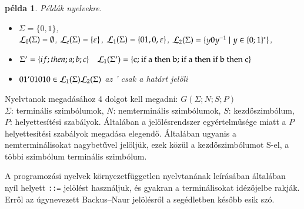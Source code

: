\documentclass[a4paper]{article}
\newtheorem{pelda}{példa}[section]
\begin{document}
\begin{pelda}
  Példák nyelvekre.
\begin{itemize}
\item $\Sigma=\{0, 1\}$,\\ ${\cal L}_0(\Sigma) = \emptyset$,
	${\cal L}_e(\Sigma) = \{\varepsilon \}$,
	${\cal L}_1(\Sigma) = \{01, 0, \varepsilon \}$,
	${\cal L}_2(\Sigma) = \{y0y^{-1} \mid y\in \{0; 1\}^*\}$,
\item $\Sigma' = \{ if; then; a; b; c\} \quad {\cal L}_1(\Sigma')=\{\mbox{c; if a then b; if a then
if b then c}\}$
\item $01'01010 \in {\cal L}_1(\Sigma){\cal L}_2(\Sigma)$ \quad az ' csak a határt jelöli
\end{itemize}
\end{pelda}

Nyelvtanok megadásához 4 dolgot kell megadni: $G(\Sigma; N; S; P)$\\
$\Sigma$: terminális szimbólumok, $N$: nemterminális szimbólumok, $S$: kezdőszimbólum, $P$: helyettesítési szabályok.
Általában a jelölésrendszer egyértelműsége miatt a $P$ helyettesítési
szabályok megadása elegendő. Általában ugyanis a nemterminálisokat
nagybetűvel jelöljük, ezek közül a kezdőszimbólumot S-el, a többi
szimbólum terminális szimbólum.

A programozási nyelvek környezetfüggetlen nyelvtanának leírásában
általában nyíl helyett \verb|::=| jelölést használjuk, és gyakran a
terminálisokat idézőjelbe rakják. Erről az úgynevezett Backus--Naur
jelölésről a segédletben később esik szó.
\end{document}
